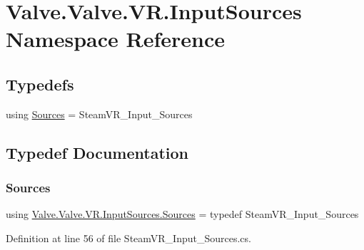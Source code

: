 \hypertarget{namespace_valve_1_1_valve_1_1_v_r_1_1_input_sources}{}\section{Valve.\+Valve.\+V\+R.\+Input\+Sources Namespace Reference}
\label{namespace_valve_1_1_valve_1_1_v_r_1_1_input_sources}
\subsection*{Typedefs}
\begin{DoxyCompactItemize}
\item 
using \mbox{\hyperlink{namespace_valve_1_1_valve_1_1_v_r_1_1_input_sources_a367a7572c70fa26061fd1d4116dd8805}{Sources}} = Steam\+V\+R\+\_\+\+Input\+\_\+\+Sources
\end{DoxyCompactItemize}


\subsection{Typedef Documentation}
\mbox{\label{namespace_valve_1_1_valve_1_1_v_r_1_1_input_sources_a367a7572c70fa26061fd1d4116dd8805}} 
\subsubsection{\texorpdfstring{Sources}{Sources}}
{\footnotesize\ttfamily using \mbox{\hyperlink{namespace_valve_1_1_valve_1_1_v_r_1_1_input_sources_a367a7572c70fa26061fd1d4116dd8805}{Valve.\+Valve.\+V\+R.\+Input\+Sources.\+Sources}} = typedef Steam\+V\+R\+\_\+\+Input\+\_\+\+Sources}



Definition at line 56 of file Steam\+V\+R\+\_\+\+Input\+\_\+\+Sources.\+cs.

